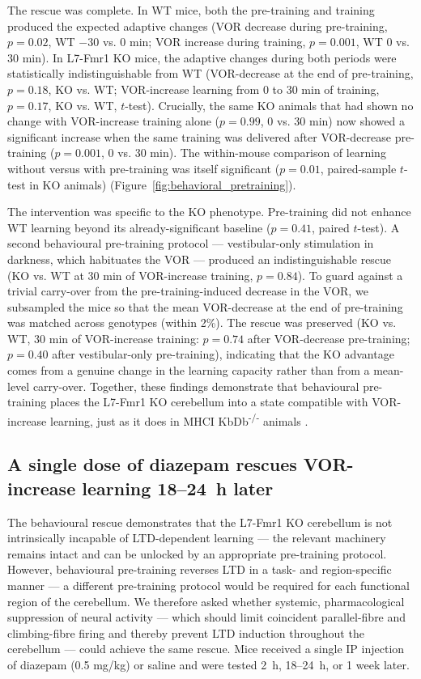 \documentclass[11pt]{article}
\begin{document}
The rescue was complete. In WT mice, both the pre-training and training
produced the expected adaptive changes (VOR decrease during pre-training,
$p = 0.02$, WT $-30$ vs. 0 min; VOR increase during training, $p = 0.001$,
WT 0 vs. 30 min). In L7-Fmr1 KO mice, the adaptive changes during both
periods were statistically indistinguishable from WT (VOR-decrease at the
end of pre-training, $p = 0.18$, KO vs. WT; VOR-increase learning from 0
to 30 min of training, $p = 0.17$, KO vs. WT, $t$-test). Crucially, the
same KO animals that had shown no change with VOR-increase training alone
($p = 0.99$, 0 vs. 30 min) now showed a significant increase when the
same training was delivered after VOR-decrease pre-training ($p = 0.001$,
0 vs. 30 min). The within-mouse comparison of learning without versus
with pre-training was itself significant ($p = 0.01$, paired-sample
$t$-test in KO animals) (Figure~\ref{fig:behavioral_pretraining}).

The intervention was specific to the KO phenotype. Pre-training did not
enhance WT learning beyond its already-significant baseline ($p = 0.41$,
paired $t$-test). A second behavioural pre-training protocol ---
vestibular-only stimulation in darkness, which habituates the VOR ---
produced an indistinguishable rescue (KO vs. WT at 30 min of VOR-increase
training, $p = 0.84$). To guard against a trivial carry-over from the
pre-training-induced decrease in the VOR, we subsampled the mice so that
the mean VOR-decrease at the end of pre-training was matched across
genotypes (within 2\%). The rescue was preserved (KO vs. WT, 30 min of
VOR-increase training: $p = 0.74$ after VOR-decrease pre-training;
$p = 0.40$ after vestibular-only pre-training), indicating that the KO
advantage comes from a genuine change in the learning capacity rather
than from a mean-level carry-over. Together, these findings demonstrate
that behavioural pre-training places the L7-Fmr1 KO cerebellum into a
state compatible with VOR-increase learning, just as it does in
MHCI KbDb\textsuperscript{-/-} animals \citep{nguyenvu2017saturation}.

\subsection{A single dose of diazepam rescues VOR-increase learning
18--24~h later}

The behavioural rescue demonstrates that the L7-Fmr1 KO cerebellum is not
intrinsically incapable of LTD-dependent learning --- the relevant
machinery remains intact and can be unlocked by an appropriate pre-training
protocol. However, behavioural pre-training reverses LTD in a task- and
region-specific manner --- a different pre-training protocol would be
required for each functional region of the cerebellum. We therefore asked whether systemic,
pharmacological suppression of neural activity --- which should limit
coincident parallel-fibre and climbing-fibre firing and thereby prevent
LTD induction throughout the cerebellum --- could achieve the same rescue.
Mice received a single IP injection of diazepam (0.5 mg/kg) or saline and
were tested 2~h, 18--24~h, or 1 week later.
\end{document}
